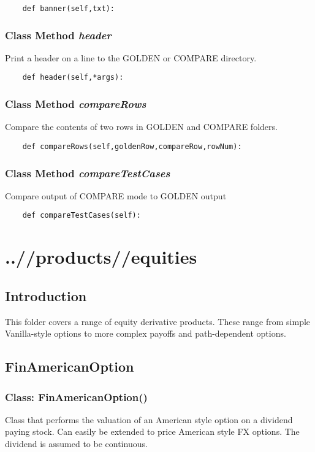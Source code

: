 \documentclass[twoside,11pt]{book}
\begin{document}
\begin{lstlisting}
    def banner(self,txt):
\end{lstlisting}

\subsection{Class Method {\it header}}
Print a header on a line to the GOLDEN or COMPARE directory. 

\begin{lstlisting}
    def header(self,*args):
\end{lstlisting}

\subsection{Class Method {\it compareRows}}
Compare the contents of two rows in GOLDEN and COMPARE folders.

\begin{lstlisting}
    def compareRows(self,goldenRow,compareRow,rowNum):
\end{lstlisting}

\subsection{Class Method {\it compareTestCases}}
Compare output of COMPARE mode to GOLDEN output 

\begin{lstlisting}
    def compareTestCases(self):
\end{lstlisting}


\chapter{..//products//equities}
\section{Introduction}
This folder covers a range of equity derivative products. These range from simple Vanilla-style options to more complex payoffs and path-dependent options. 
\newpage
\section{FinAmericanOption}

\subsection{Class: FinAmericanOption()}
Class that performs the valuation of an American style option on a dividend paying stock. Can easily be extended to price American style FX options. The dividend is assumed to be continuous. 
\end{document}
